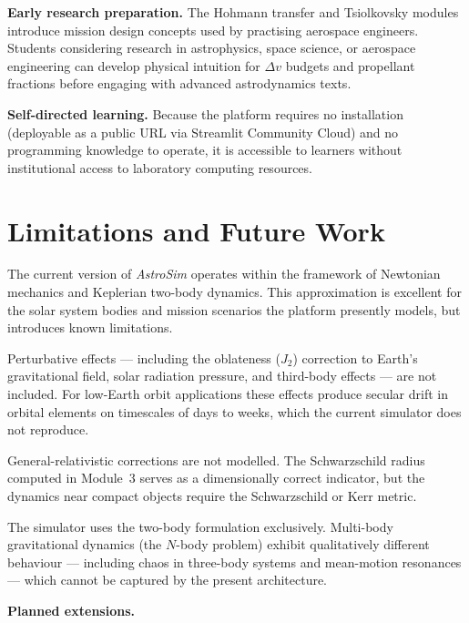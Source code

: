 \documentclass[10pt,a4paper]{article}
\begin{document}
\textbf{Early research preparation.}
The Hohmann transfer and Tsiolkovsky modules introduce mission design concepts
used by practising aerospace engineers.
Students considering research in astrophysics, space science, or aerospace
engineering can develop physical intuition for $\Delta v$ budgets and
propellant fractions before engaging with advanced astrodynamics texts.

\textbf{Self-directed learning.}
Because the platform requires no installation (deployable as a public URL via
Streamlit Community Cloud) and no programming knowledge to operate, it is
accessible to learners without institutional access to laboratory computing
resources.

\section{Limitations and Future Work}

The current version of \textit{AstroSim} operates within the framework of
Newtonian mechanics and Keplerian two-body dynamics.
This approximation is excellent for the solar system bodies and mission
scenarios the platform presently models, but introduces known limitations.

Perturbative effects — including the oblateness ($J_2$) correction to Earth's
gravitational field, solar radiation pressure, and third-body effects —
are not included.
For low-Earth orbit applications these effects produce secular drift in orbital
elements on timescales of days to weeks, which the current simulator does not
reproduce.

General-relativistic corrections are not modelled.
The Schwarzschild radius computed in Module~3 serves as a dimensionally correct
indicator, but the dynamics near compact objects require the Schwarzschild or
Kerr metric.

The simulator uses the two-body formulation exclusively.
Multi-body gravitational dynamics (the $N$-body problem) exhibit qualitatively
different behaviour — including chaos in three-body systems \citep{poincare1892}
and mean-motion resonances — which cannot be captured by the present architecture.

\textbf{Planned extensions.}
\end{document}
